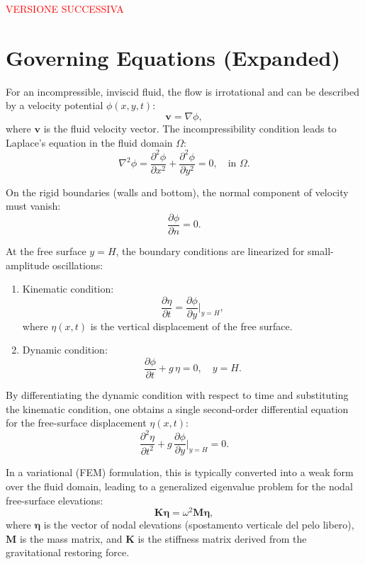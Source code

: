 \documentclass{article}
\begin{document}
\textcolor{red}{\Huge VERSIONE SUCCESSIVA}

\section{Governing Equations (Expanded)}
For an incompressible, inviscid fluid, the flow is irrotational and can be described by a velocity potential $\phi(x,y,t)$:
\begin{equation}
\bm{v} = \nabla \phi,
\end{equation}
where $\bm{v}$ is the fluid velocity vector. The incompressibility condition leads to Laplace's equation in the fluid domain $\Omega$:
\begin{equation}
\nabla^2 \phi = \frac{\partial^2 \phi}{\partial x^2} + \frac{\partial^2 \phi}{\partial y^2} = 0, \quad \text{in } \Omega.
\end{equation}


On the rigid boundaries (walls and bottom), the normal component of velocity must vanish:
\begin{equation}
\frac{\partial \phi}{\partial n} = 0.
\end{equation}


At the free surface $y = H$, the boundary conditions are linearized for small-amplitude oscillations:
\begin{enumerate}
\item Kinematic condition:
\begin{equation}
\frac{\partial \eta}{\partial t} = \frac{\partial \phi}{\partial y} \Big|_{y=H},
\end{equation}
where $\eta(x,t)$ is the vertical displacement of the free surface.


\item Dynamic condition:
\begin{equation}
\frac{\partial \phi}{\partial t} + g \, \eta = 0, \quad y = H.
\end{equation}
\end{enumerate}


By differentiating the dynamic condition with respect to time and substituting the kinematic condition, one obtains a single second-order differential equation for the free-surface displacement $\eta(x,t)$:
\begin{equation}
\frac{\partial^2 \eta}{\partial t^2} + g \, \frac{\partial \phi}{\partial y} \Big|_{y=H} = 0.
\end{equation}


In a variational (FEM) formulation, this is typically converted into a weak form over the fluid domain, leading to a generalized eigenvalue problem for the nodal free-surface elevations:
\begin{equation}
\bm{K} \bm{\eta} = \omega^2 \bm{M} \bm{\eta},
\end{equation}
where $\bm{\eta}$ is the vector of nodal elevations (spostamento verticale del pelo libero), $\bm{M}$ is the mass matrix, and $\bm{K}$ is the stiffness matrix derived from the gravitational restoring force.
\end{document}
